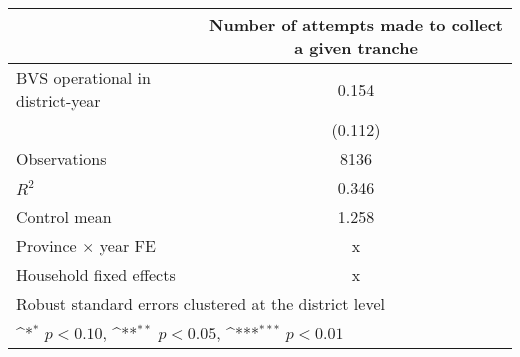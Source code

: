 {
\def\sym#1{\ifmmode^{#1}\else\(^{#1}\)\fi}
\begin{tabular}{l*{1}{c}}
\toprule
                    &\multicolumn{1}{c}{Number of attempts made to collect a given tranche}\\
\midrule
BVS operational in district-year&       0.154         \\
                    &     (0.112)         \\
\midrule
Observations        &        8136         \\
\(R^{2}\)           &       0.346         \\
Control mean        &       1.258         \\
Province $\times$  year FE&           x         \\
Household fixed effects&           x         \\
\bottomrule
\multicolumn{2}{l}{\footnotesize Robust standard errors clustered at the district level}\\
\multicolumn{2}{l}{\footnotesize \sym{*} \(p<0.10\), \sym{**} \(p<0.05\), \sym{***} \(p<0.01\)}\\
\end{tabular}
}
